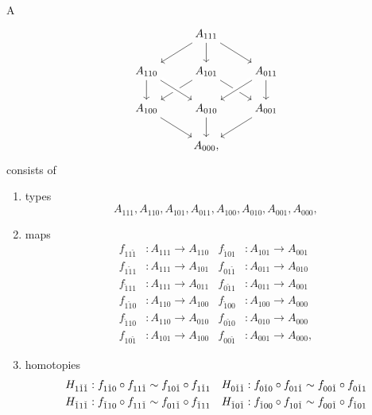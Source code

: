 \begin{defn}\label{defn:cube}
A \label{defn:cube}
\begin{equation*}
\begin{tikzcd}
& A_{111} \arrow[dl] \arrow[dr] \arrow[d] \\
A_{110} \arrow[d] & A_{101} \arrow[dl] \arrow[dr] & A_{011} \arrow[dl,crossing over] \arrow[d] \\
A_{100} \arrow[dr] & A_{010} \arrow[d] \arrow[from=ul,crossing over] & A_{001} \arrow[dl] \\
& A_{000},
\end{tikzcd}
\end{equation*}
consists of 
\begin{enumerate}
\item types
\begin{equation*}
A_{111},A_{110},A_{101},A_{011},A_{100},A_{010},A_{001},A_{000},
\end{equation*}
\item \begin{samepage}%
maps
\begin{align*}
f_{11\check{1}} & : A_{111}\to A_{110} & f_{\check{1}01} & : A_{101}\to A_{001} \\
f_{1\check{1}1} & : A_{111}\to A_{101} & f_{01\check{1}} & : A_{011}\to A_{010} \\
f_{\check{1}11} & : A_{111}\to A_{011} & f_{0\check{1}1} & : A_{011}\to A_{001} \\
f_{1\check{1}0} & : A_{110}\to A_{100} & f_{\check{1}00} & : A_{100}\to A_{000} \\
f_{\check{1}10} & : A_{110}\to A_{010} & f_{0\check{1}0} & : A_{010}\to A_{000} \\
f_{10\check{1}} & : A_{101}\to A_{100} & f_{00\check{1}} & : A_{001}\to A_{000},
\end{align*}
\end{samepage}%
\item homotopies
\begin{align*}
H_{1\check{1}\check{1}} & : f_{1\check{1}0}\circ f_{11\check{1}} \htpy f_{10\check{1}}\circ f_{1\check{1}1} & H_{0\check{1}\check{1}} & : f_{0\check{1}0}\circ f_{01\check{1}} \htpy f_{00\check{1}}\circ f_{0\check{1}1} \\
H_{\check{1}1\check{1}} & : f_{\check{1}10}\circ f_{11\check{1}} \htpy f_{01\check{1}}\circ f_{\check{1}11} & H_{\check{1}0\check{1}} & : f_{\check{1}00}\circ f_{10\check{1}} \htpy f_{00\check{1}}\circ f_{\check{1}01} \\

\end{align*}
\end{enumerate}
\end{defn}
